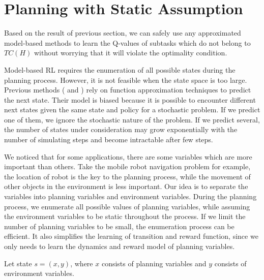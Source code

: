 \documentclass{article} %
\begin{document}

\section{Planning with Static Assumption}
\label{se:Model}

Based on the result of previous section, we can safely use any approximated model-based methods 
to learn the Q-values of subtasks which do not belong to $TC(H)$ without worrying
that it will violate the optimality condition.

Model-based RL requires the enumeration of all possible states during the planning process.
However, it is not feasible when the state space is too large.
Previous methods (\cite{ApproxDyna} and \cite{ApproxTree}) rely on function approximation
techniques to predict the next state. Their model is biased because it is possible 
to encounter different next states given the same state and policy for a stochastic problem. If we 
predict one of them, we ignore the stochastic nature of the problem. If we predict
several, the number of states under consideration may grow exponentially with the number of simulating steps
and become intractable after few steps.

We noticed that for some applications, there are some variables which are more important
than others. Take the mobile robot navigation problem for example, the location of robot 
is the key to the planning process, while the movement of other objects in the environment is less important.
Our idea is to separate the variables into planning variables 
and environment variables. During the planning process, we enumerate all possible values of planning variables, while assuming 
the environment variables to be static throughout the process. 
If we limit the number of planning variables to be small, the enumeration process can be efficient.
It also simplifies the learning of transition and reward function, since we only needs to learn
the dynamics and reward model of planning variables.

Let state $s = (x, y)$, where $x$ consists of planning variables and $y$ consists of environment
variables. 
\end{document}
